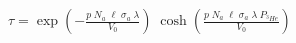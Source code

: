 


\begin{eqnarray*}
  \tau = \exp \left(-\frac{p \; N_a \; \ell \; \sigma_a \; \lambda}{V_0} \right) \; \cosh \left( \frac{p \; N_a \; \ell \; \sigma_a \; \lambda \;  P_{^{3}He}}{V_0} \right)
\end{eqnarray*}

